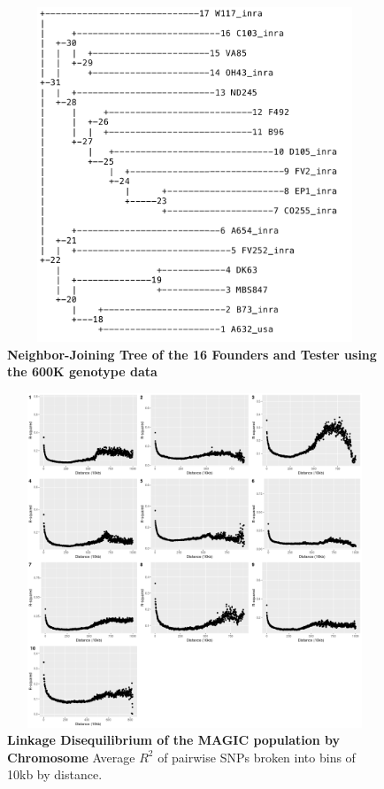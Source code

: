 \documentclass[article,9pt,twocolumn,twoside]{rilabRxiv}
\begin{document}
\begin{figure}[ht]
\centering
\includegraphics[width=16cm,height=10cm]{figures/nj_tree.png}
\caption{\textbf{Neighbor-Joining Tree of the 16 Founders and Tester using the 600K genotype data}}
\label{fig:supfigure9}
\end{figure}

\begin{figure}[ht]
\centering
\includegraphics[width=16cm,height=10cm]{figures/all_chroms_ld_decay.png}
\caption{\textbf{Linkage Disequilibrium of the MAGIC population by Chromosome} Average $R^2$ of pairwise SNPs broken into bins of 10kb by distance.}
\label{fig:supfigure10}
\end{figure}
\end{document}
